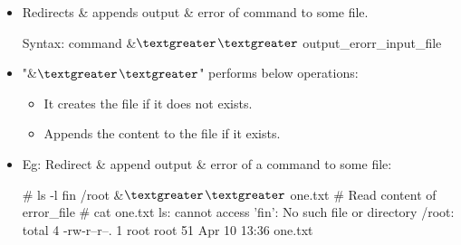 \setlength{\columnsep}{3pt}
\begin{flushleft}

	\begin{itemize}
	\item Redirects \& appends output \& error of command to some file.
	\bigskip
	\begin{tcolorbox}[breakable,notitle,boxrule=-0pt,colback=pink,colframe=pink]
		\color{black}
		\font=9pt
		Syntax: command \&{$\textgreater$}{$\textgreater$} output\_erorr\_input\_file
		\font=4pt
	\end{tcolorbox}
	\item "\&{$\textgreater$}{$\textgreater$}" performs below operations:
	\begin{itemize}
		\item It creates the file if it does not exists.
		\item Appends the content to the file if it exists.
	\end{itemize}
	\item
	Eg: Redirect \& append output \& error of a command to some file:
	\bigskip
	\begin{tcolorbox}[breakable,notitle,boxrule=-0pt,colback=black,colframe=black]
		\color{green}
		\font=9pt
		\# ls -l fin /root \&{$\textgreater$}{$\textgreater$} one.txt
		\newline
		\newline
		\color{yellow}
		\# Read content of error\_file
		\color{green}
		\newline
		\# cat one.txt
		\newline
		\color{white}
		ls: cannot access 'fin': No such file or directory
		\newline
		/root:
		\color{white}
		\newline
		total 4
		\color{white}
		\newline
		\color{white} -rw-r--r--. 1 root root 51 Apr 10 13:36 one.txt
		\font=4pt
	\end{tcolorbox}

\end{itemize}
	

	
\end{flushleft}



\newpage
